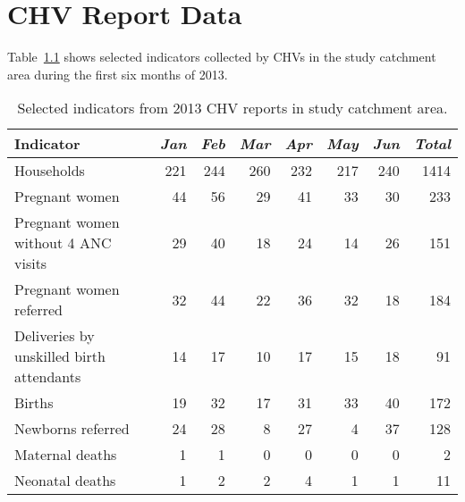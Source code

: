 \chapter{CHV Report Data}
Table~\ref{tab:chvreport2013} shows selected indicators collected by CHVs in the study catchment area during the first six months of 2013. 

\begin{table}[htbp]
  \caption{Selected indicators from 2013 CHV reports in study catchment area.}
    \begin{tabular}{lrrrrrrr}
    \toprule
    \textbf{Indicator} & \textit{Jan} & \textit{Feb} & \textit{Mar} & \textit{Apr} & \textit{May } & \textit{Jun} & \textit{\textbf{Total}} \\
    \midrule
    Households & 221   & 244   & 260   & 232   & 217   & 240   & 1414 \\
    Pregnant women & 44    & 56    & 29    & 41    & 33    & 30    & 233 \\
    Pregnant women without 4 ANC visits & 29    & 40    & 18    & 24    & 14    & 26    & 151 \\
    Pregnant women referred & 32    & 44    & 22    & 36    & 32    & 18    & 184 \\
    Deliveries by unskilled birth attendants & 14    & 17    & 10    & 17    & 15    & 18    & 91 \\
    Births & 19    & 32    & 17    & 31    & 33    & 40    & 172 \\
    Newborns referred & 24    & 28    & 8     & 27    & 4     & 37    & 128 \\
    Maternal deaths & 1     & 1     & 0     & 0     & 0     & 0     & 2 \\
    Neonatal deaths & 1     & 2     & 2     & 4     & 1     & 1     & 11 \\
    \bottomrule
    \end{tabular}%
  \label{tab:chvreport2013}%
\end{table}%

